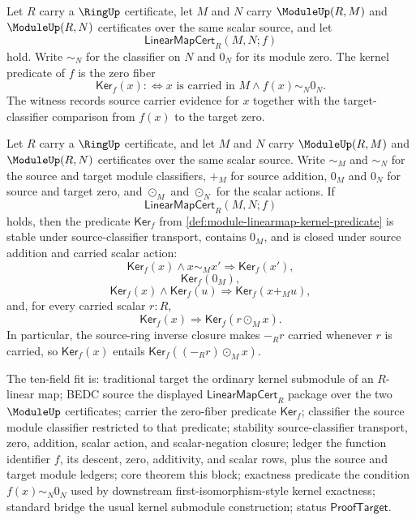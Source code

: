 \begin{definition}
\label{def:module-linearmap-kernel-predicate}
Let $R$ carry a $\RingUp$ certificate, let $M$ and $N$ carry $\ModuleUp(R,M)$ and $\ModuleUp(R,N)$ certificates over the same scalar source, and let
$$
\mathsf{LinearMapCert}_R(M,N;f)
$$
hold. Write $\sim_N$ for the classifier on $N$ and $0_N$ for its module zero. The kernel predicate of $f$ is the zero fiber
$$
\mathsf{Ker}_f(x):\Longleftrightarrow x\text{ is carried in }M\land f(x)\sim_N0_N.
$$
The witness records source carrier evidence for $x$ together with the target-classifier comparison from $f(x)$ to the target zero.
\end{definition}

\begin{theorem}
\label{thm:module-linearmap-kernel-submodule-closure}
Let $R$ carry a $\RingUp$ certificate, and let $M$ and $N$ carry $\ModuleUp(R,M)$ and $\ModuleUp(R,N)$ certificates over the same scalar source. Write $\sim_M$ and $\sim_N$ for the source and target module classifiers, $+_M$ for source addition, $0_M$ and $0_N$ for source and target zero, and $\odot_M$ and $\odot_N$ for the scalar actions. If
$$
\mathsf{LinearMapCert}_R(M,N;f)
$$
holds, then the predicate $\mathsf{Ker}_f$ from \autoref{def:module-linearmap-kernel-predicate} is stable under source-classifier transport, contains $0_M$, and is closed under source addition and carried scalar action:
$$
\mathsf{Ker}_f(x)\land x\sim_Mx'\Longrightarrow\mathsf{Ker}_f(x'),
$$
$$
\mathsf{Ker}_f(0_M),
$$
$$
\mathsf{Ker}_f(x)\land\mathsf{Ker}_f(u)\Longrightarrow\mathsf{Ker}_f(x+_M u),
$$
and, for every carried scalar $r:R$,
$$
\mathsf{Ker}_f(x)\Longrightarrow\mathsf{Ker}_f(r\odot_M x).
$$
In particular, the source-ring inverse closure makes $-_R r$ carried whenever $r$ is carried, so $\mathsf{Ker}_f(x)$ entails $\mathsf{Ker}_f((-_R r)\odot_M x)$.

The ten-field fit is: traditional target the ordinary kernel submodule of an $R$-linear map; BEDC source the displayed $\mathsf{LinearMapCert}_R$ package over the two $\ModuleUp$ certificates; carrier the zero-fiber predicate $\mathsf{Ker}_f$; classifier the source module classifier restricted to that predicate; stability source-classifier transport, zero, addition, scalar action, and scalar-negation closure; ledger the function identifier $f$, its descent, zero, additivity, and scalar rows, plus the source and target module ledgers; core theorem this block; exactness predicate the condition $f(x)\sim_N0_N$ used by downstream first-isomorphism-style kernel exactness; standard bridge the usual kernel submodule construction; status $\mathsf{ProofTarget}$.
\end{theorem}
